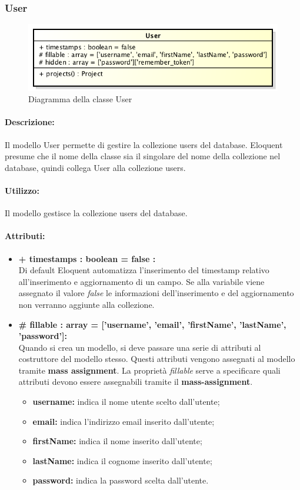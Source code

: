 \subsubsection{User}

	\begin{figure}[h]
		\centering
		\includegraphics[width=0.5\linewidth]{img/back_end_user_model}
		\caption[Diagramma della classe User]{Diagramma della classe User}
		\label{fig:back_end_user_model}
	\end{figure}


	\paragraph{Descrizione:}
	Il modello User permette di gestire la collezione users del database. Eloquent presume che il nome della classe sia il singolare del nome della collezione nel database, quindi collega User alla collezione users.

	\paragraph{Utilizzo:}
	Il modello gestisce la collezione users del database.
	
	\paragraph{Attributi:}
	\begin{itemize}
		\item \textbf{+ timestamps : boolean = false :}\\
		Di default Eloquent automatizza l'inserimento del timestamp relativo all'inserimento e aggiornamento di un campo. Se alla variabile viene assegnato il valore \textit{false} le informazioni dell'inserimento e del aggiornamento non verranno aggiunte alla collezione.
		\item \textbf{\# fillable : array = ['username', 'email', 'firstName', 'lastName', 'password']:}\\
		Quando si crea un modello, si deve passare una serie di attributi al costruttore del modello stesso. Questi attributi vengono assegnati al modello tramite \textbf{mass assignment}. La proprietà \textit{fillable} serve a specificare quali attributi devono essere assegnabili tramite il \textbf{mass-assignment}.
		\begin{itemize}
			\item \textbf{username:} indica il nome utente scelto dall'utente;
			\item \textbf{email:} indica l'indirizzo email inserito dall'utente;
			\item \textbf{firstName:} indica il nome inserito dall'utente;
			\item \textbf{lastName:} indica il cognome inserito dall'utente;
			\item \textbf{password:} indica la password scelta dall'utente.
		\end{itemize}
	\end{itemize}
	
